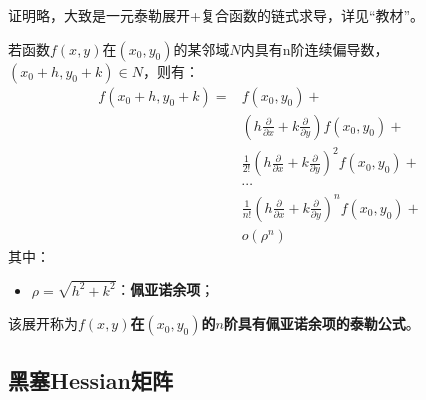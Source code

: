 证明略，大致是一元泰勒展开+复合函数的链式求导，详见“教材\cite{book1}”。

\begin{theorem}
若函数$f\left( x,y \right) $在$\left( x_0,y_0 \right) $的某邻域$N$内具有n阶连续偏导数，$\left( x_0+h,y_0+k \right) \in N$，则有：
\begin{align*}
f\left( x_0+h,y_0+k \right) =&f\left( x_0,y_0 \right) + \\
&\left( h\frac{\partial}{\partial x}+k\frac{\partial}{\partial y} \right) f\left( x_0,y_0 \right) + \\
&\frac{1}{2!}\left( h\frac{\partial}{\partial x}+k\frac{\partial}{\partial y} \right) ^2f\left( x_0,y_0 \right) + \\
&\cdots \\
&\frac{1}{n!}\left( h\frac{\partial}{\partial x}+k\frac{\partial}{\partial y} \right) ^nf\left( x_0,y_0 \right) + \\
&o\left( \rho ^n \right)
\end{align*}
其中：
\begin{itemize}
    \item $\rho =\sqrt{h^2+k^2}$：{\bf 佩亚诺余项}；
\end{itemize}
该展开称为{\bf $f\left( x,y \right) $在$\left( x_0,y_0 \right) $的$n$阶具有佩亚诺余项的泰勒公式}。
\end{theorem}

\subsection{黑塞Hessian矩阵}

